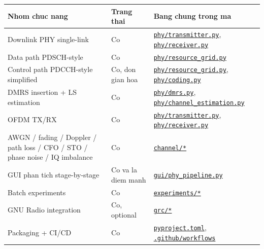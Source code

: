 \documentclass[
  vietnamese,
  a4paper,
  11pt]{article}
\newcounter{none} %
\begin{document}
{\def\LTcaptype{none} %
\begin{longtable}[]{@{}
  >{\raggedright\arraybackslash}p{}
  >{\raggedright\arraybackslash}p{}
  >{\raggedright\arraybackslash}p{}@{}}
\toprule\noalign{}
\begin{minipage}[b]{\linewidth}\raggedright
Nhom chuc nang
\end{minipage} & \begin{minipage}[b]{\linewidth}\raggedright
Trang thai
\end{minipage} & \begin{minipage}[b]{\linewidth}\raggedright
Bang chung trong ma
\end{minipage} \\
\midrule\noalign{}
\endhead
\bottomrule\noalign{}
\endlastfoot
Downlink PHY single-link & Co &
\href{../phy/transmitter.py}{\texttt{phy/transmitter.py}},
\href{../phy/receiver.py}{\texttt{phy/receiver.py}} \\
Data path PDSCH-style & Co &
\href{../phy/resource_grid.py}{\texttt{phy/resource\_grid.py}} \\
Control path PDCCH-style simplified & Co, don gian hoa &
\href{../phy/resource_grid.py}{\texttt{phy/resource\_grid.py}},
\href{../phy/coding.py}{\texttt{phy/coding.py}} \\
DMRS insertion + LS estimation & Co &
\href{../phy/dmrs.py}{\texttt{phy/dmrs.py}},
\href{../phy/channel_estimation.py}{\texttt{phy/channel\_estimation.py}} \\
OFDM TX/RX & Co &
\href{../phy/transmitter.py}{\texttt{phy/transmitter.py}},
\href{../phy/receiver.py}{\texttt{phy/receiver.py}} \\
AWGN / fading / Doppler / path loss / CFO / STO / phase noise / IQ
imbalance & Co & \href{../channel}{\texttt{channel/*}} \\
GUI phan tich stage-by-stage & Co va la diem manh &
\href{../gui/phy_pipeline.py}{\texttt{gui/phy\_pipeline.py}} \\
Batch experiments & Co &
\href{../experiments}{\texttt{experiments/*}} \\
GNU Radio integration & Co, optional & \href{../grc}{\texttt{grc/*}} \\
Packaging + CI/CD & Co &
\href{../pyproject.toml}{\texttt{pyproject.toml}},
\href{../.github/workflows}{\texttt{.github/workflows}} \\
\end{longtable}
}
\end{document}
